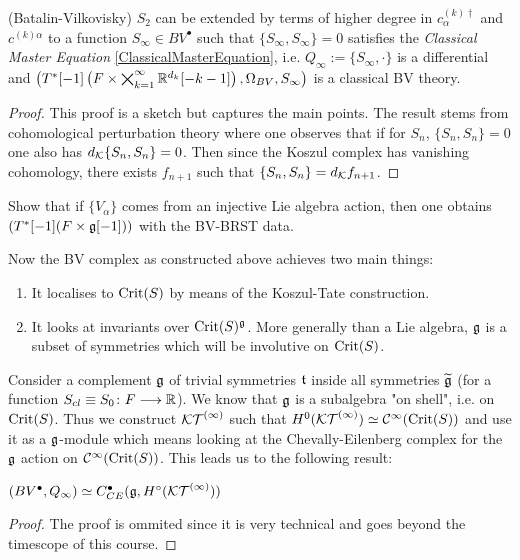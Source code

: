 \begin{theo}(Batalin-Vilkovisky)
  $S_2$ can be extended by terms of higher degree in $c^{(k) \dagger}_\alpha$ and $c^{(k) \alpha}$ to a function $S_\infty \in BV^\bullet$ such that $\{S_\infty, S_\infty\} = 0$ satisfies the \emph{Classical Master Equation} \eqref{ClassicalMasterEquation}, i.e. $Q_\infty := \{S_\infty, \cdot \}$ is a differential and $\left(T^*[-1]\left(F \times \bigtimes_{k = 1}^\infty \mathbb{R}^{d_k}[-k-1]\right), \Omega_{BV}, S_\infty\right)$ is a classical BV theory.
\begin{proof}
  This proof is a sketch but captures the main points. The result stems from cohomological perturbation theory where one observes that if for $S_n$, $\{S_n, S_n\} = 0$ one also has $d_{{\mathcal{K}}} \{S_n, S_n\} = 0$. Then since the Koszul complex has vanishing cohomology, there exists $f_{n+1}$ such that $\{S_n, S_n\} = d_{{\mathcal{K}}} f_{n+1}$.
\end{proof}
\end{theo}

\begin{ex}
  Show that if $\{V_\alpha\}$ comes from an injective Lie algebra action, then one obtains $(T^*[-1](F \times \mathfrak{g}[-1]))$ with the BV-BRST data.
\end{ex}

Now the BV complex as constructed above achieves two main things:
\begin{enumerate}
  \item It localises to $\operatorname{Crit}(S)$ by means of the Koszul-Tate construction.
  \item It looks at invariants over $\operatorname{Crit}(S)^{\mathfrak{g}}$. More generally than a Lie algebra, $\mathfrak{g}$ is a subset of symmetries which will be involutive on $\operatorname{Crit}(S)$.
\end{enumerate}

Consider a complement $\mathfrak{g}$ of trivial symmetries $\mathfrak{t}$ inside all symmetries $\widetilde{\mathfrak{g}}$ (for a function $S_{cl} \equiv S_0 \colon F \longrightarrow \mathbb{R}$). We know that $\mathfrak{g}$ is a subalgebra "on shell", i.e. on $\operatorname{Crit}(S)$. Thus we construct ${\mathcal{KT}}^{(\infty)}$ such that $H^0({\mathcal{KT}}^{(\infty)}) \simeq \mathcal{C}^{\infty}(\operatorname{Crit}(S))$ and use it as a $\mathfrak{g}$-module which means looking at the Chevally-Eilenberg complex for the $\mathfrak{g}$ action on $\mathcal{C}^{\infty}(\operatorname{Crit}(S))$. This leads us to the following result:

\begin{theo}
  $(BV^\bullet, Q_\infty) \simeq C^\bullet_{CE}(\mathfrak{g}, H^\circ({\mathcal{KT}}^{(\infty)}))$
\begin{proof}
  The proof is ommited since it is very technical and goes beyond the timescope of this course.
\end{proof}
\end{theo}

